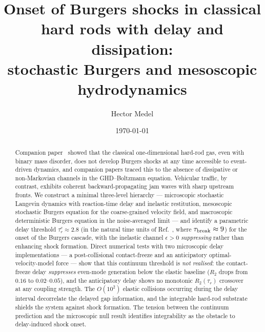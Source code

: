 \documentclass[aps,pre,twocolumn,superscriptaddress,longbibliography,floatfix]{revtex4-2}
\begin{document}
\title{Onset of Burgers shocks in classical hard rods with delay
and dissipation:\\ stochastic Burgers and mesoscopic
hydrodynamics}

\author{Hector Medel}

\date{\today}

\begin{abstract}
Companion paper~\cite{PaperIII} showed that the classical
one-dimensional hard-rod gas, even with binary mass disorder,
does not develop Burgers shocks at any time accessible to
event-driven dynamics, and companion papers
\cite{PaperIV,PaperV} traced this to the absence of
dissipative or non-Markovian channels in the GHD--Boltzmann
equation. Vehicular traffic, by contrast, exhibits coherent
backward-propagating jam waves with sharp upstream fronts.
We construct a minimal three-level hierarchy --- microscopic
stochastic Langevin dynamics with reaction-time delay and
inelastic restitution, mesoscopic stochastic Burgers
equation for the coarse-grained velocity field, and
macroscopic deterministic Burgers equation in the
noise-averaged limit --- and identify a parametric delay
threshold $\tau_r^c\approx 2.8$ (in the natural time units
of Ref.~\cite{PaperIII}, where $\tau_{\rm break}\approx 9$)
for the onset of the Burgers cascade, with the inelastic
channel $\epsilon>0$ \emph{suppressing} rather than enhancing
shock formation. Direct numerical tests with two
microscopic delay implementations --- a post-collisional
contact-freeze and an anticipatory optimal-velocity-model
force --- show that this continuum threshold is \emph{not
realised}: the contact-freeze delay \emph{suppresses}
even-mode generation below the elastic baseline
($R_2$ drops from $0.16$ to $0.02$--$0.05$), and the
anticipatory delay shows no monotonic $R_2(\tau_r)$
crossover at any coupling strength. The $O(10^2)$ elastic
collisions occurring during the delay interval decorrelate
the delayed gap information, and the integrable hard-rod
substrate shields the system against shock formation.
The tension between the continuum prediction and the
microscopic null result identifies integrability as the
obstacle to delay-induced shock onset.
\end{abstract}

\maketitle
\end{document}

